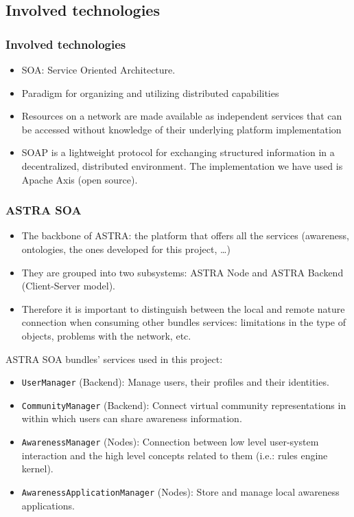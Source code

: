 \subsection{Involved technologies}

\begin{frame}

	\frametitle{Involved technologies} 
	
	\begin{itemize}
	  \item SOA: Service Oriented Architecture.
	  \item Paradigm for organizing and utilizing distributed
	capabilities
	  \item Resources on a network are made available
		as independent services that can be accessed without knowledge of their
		underlying platform implementation
	  \item SOAP is a lightweight protocol for exchanging structured information in
	a decentralized, distributed environment. The implementation we have used is
	Apache Axis (open source).
	\end{itemize}

\end{frame}


\begin{frame}

	\frametitle{ASTRA SOA} 
	
	\begin{itemize}
	  \item The backbone of ASTRA: the platform that offers all the services
	  (awareness, ontologies, the ones developed for this project, \ldots)
	  \item They are grouped into two subsystems: ASTRA Node and
		ASTRA Backend (Client-Server model).
	  \item Therefore it is important to distinguish between the local and remote
	  nature connection when consuming other bundles services: limitations in the
	  type of objects, problems with the network, etc.
	\end{itemize}


\end{frame}


\begin{frame}

	ASTRA SOA bundles' services used in this project:

	\begin{itemize}
	  \item \texttt{UserManager} (Backend): Manage users, their profiles 
	 and their identities.
	  \item \texttt{CommunityManager} (Backend): Connect virtual community
	  representations in within which users can share awareness information.
	  \item \texttt{AwarenessManager} (Nodes): Connection
	  between low level user-system interaction and the high level concepts related to
	  them (i.e.: rules engine kernel).
	  \item \texttt{AwarenessApplicationManager} (Nodes): Store
	  and manage local awareness applications.
	\end{itemize}


\end{frame}


